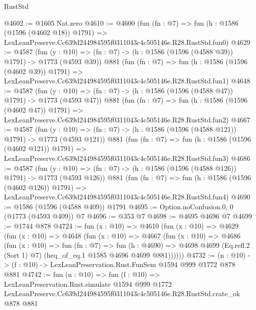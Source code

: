 \begin{lexlean}{RustStd}
\begin{coremodule}
@4602 := @1605 Nat.zero
@4610 := @4600
    (fun (fn : @7) =>
    fun (h : @1586 (@1596 (@4602 @18)) @1791) =>
    LexLeanPreserve.Cc639d244984595f0311043c4c505146e.R28.RustStd.fun0)
@4629 := @4587
    (fun (y : @10) => (fn : @7) -> (h : @1586 (@1596 (@4588 @39)) @1791) -> @1773 (@4593 @39))
    @881
    (fun (fn : @7) =>
    fun (h : @1586 (@1596 (@4602 @39)) @1791) =>
    LexLeanPreserve.Cc639d244984595f0311043c4c505146e.R28.RustStd.fun1)
@4648 := @4587
    (fun (y : @10) => (fn : @7) -> (h : @1586 (@1596 (@4588 @47)) @1791) -> @1773 (@4593 @47))
    @881
    (fun (fn : @7) =>
    fun (h : @1586 (@1596 (@4602 @47)) @1791) =>
    LexLeanPreserve.Cc639d244984595f0311043c4c505146e.R28.RustStd.fun2)
@4667 := @4587
    (fun (y : @10) => (fn : @7) -> (h : @1586 (@1596 (@4588 @121)) @1791) -> @1773 (@4593 @121))
    @881
    (fun (fn : @7) =>
    fun (h : @1586 (@1596 (@4602 @121)) @1791) =>
    LexLeanPreserve.Cc639d244984595f0311043c4c505146e.R28.RustStd.fun3)
@4686 := @4587
    (fun (y : @10) => (fn : @7) -> (h : @1586 (@1596 (@4588 @126)) @1791) -> @1773 (@4593 @126))
    @881
    (fun (fn : @7) =>
    fun (h : @1586 (@1596 (@4602 @126)) @1791) =>
    LexLeanPreserve.Cc639d244984595f0311043c4c505146e.R28.RustStd.fun4)
@4690 := @1586 (@1596 (@4588 @409)) @1791
@4695 := Option.noConfusion.{0, 0} (@1773 (@4593 @409)) @7
@4696 := @353 @7
@4698 := @4695 @4696 @7
@4699 := @1744 @878
@4724 := fun (x : @10) =>
  @4610
    (fun (x : @10) =>
    @4629
      (fun (x : @10) =>
      @4648
        (fun (x : @10) =>
        @4667
          (fun (x : @10) =>
          @4686
            (fun (x : @10) =>
            fun (fn : @7) =>
            fun (h : @4690) =>
            @4698 @4699 (Eq.refl.{2} (Sort 1) @7) (heq_of_eq.{1} @1585 @4696 @4699 @881))))))
@4732 := (n : @10) -> (f : @10) -> LexLeanPreservation.Rust.FunSem @1594 @999 @1772 @878 @881
@4742 := fun (n : @10) =>
  fun (f : @10) =>
  LexLeanPreservation.Rust.simulate
    @1594
    @999
    @1772
    LexLeanPreserve.Cc639d244984595f0311043c4c505146e.R28.RustStd.crate_ok
    @878
    @881
\end{coremodule}
\end{lexlean}
